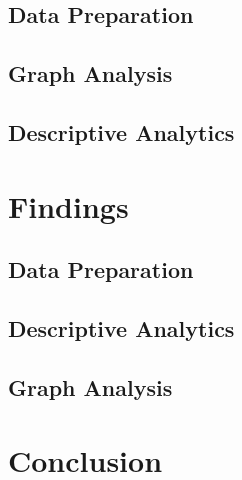 \documentclass[conference]{IEEEtran}
\begin{document}
\subsection{Data Preparation}


\subsection{Graph Analysis}


\subsection{Descriptive Analytics}


\section{Findings}

\subsection{Data Preparation}


\subsection{Descriptive Analytics}


\subsection{Graph Analysis}


\section{Conclusion}


\newpage
\newpage


\end{document}
